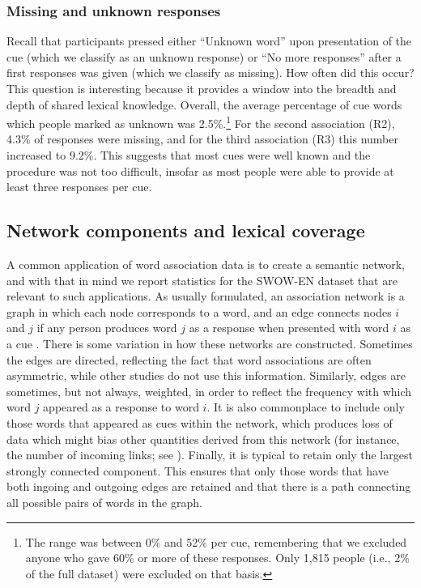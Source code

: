 \documentclass[a4paper,doc,natbib,floatsintext]{apa6}
\begin{document}
\subsubsection{Missing and unknown responses}
Recall that participants pressed either ``Unknown word'' upon presentation of the cue (which we classify as an unknown response) or ``No more responses'' after a first responses was given (which we classify as missing). How often did this occur? This question is interesting because it provides a window into the breadth and depth of shared lexical knowledge. Overall, the average percentage of cue words which people marked as unknown was 2.5\%.\footnote{The range was between 0\% and 52\% per cue, remembering that we excluded anyone who gave 60\% or more of these responses. Only 1,815 people (i.e., 2\% of the full dataset) were excluded on that basis.}
For the second association (R2), 4.3\% of responses were missing, and for the third association (R3) this number increased to 9.2\%. This suggests that most cues were well known and the procedure was not too difficult, insofar as most people were able to provide at least three responses per cue.


\subsection{Network components and lexical coverage}

A common application of word association data is to create a semantic network, and with that in mind we report statistics for the SWOW-EN dataset that are relevant to such applications. As usually formulated, an association network is a graph in which each node corresponds to a word, and an edge connects nodes $i$ and $j$ if any person produces word $j$ as a response when presented with word $i$ as a cue \cite[see for instance][]{DeDeyne2008b,DeDeyne2016JEP,Dubossarsky2017, Steyvers2005}. There is some variation in how these networks are constructed. Sometimes the edges are directed, reflecting the fact that word associations are often asymmetric, while other studies do not use this information. Similarly, edges are sometimes, but not always, weighted, in order to reflect the frequency with which word $j$ appeared as a response to word $i$. It is also commonplace to include only those words that appeared as cues within the network, which produces loss of data which might bias other quantities derived from this network (for instance, the number of incoming links; see \citet{DeDeyne2013}). Finally, it is typical to retain only the largest strongly connected component. This ensures that only those words that have both ingoing and outgoing edges are retained and that there is a path connecting all possible pairs of words in the graph.
\end{document}
